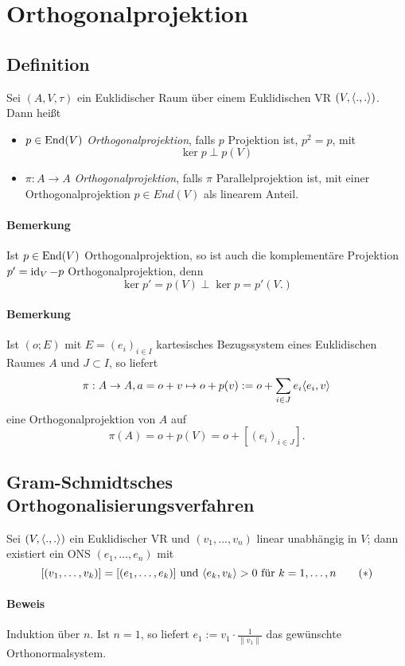 \section{Orthogonalprojektion}
\subsection{Definition}
\begin{Definition}[Orthogonalprojektion]
	Sei $ (A,V,\tau) $ ein Euklidischer Raum über einem Euklidischen VR $ (V, \langle .,. \rangle) $. Dann heißt
		\begin{itemize}
			\item $ p\in \operatorname{End}(V) $ \emph{Orthogonalprojektion}, falls $ p $ Projektion ist, $ p^2 = p $, mit
				\[ \ker p \perp p(V) \]
			\item $ \pi: A\to A $ \emph{Orthogonalprojektion}, falls $ \pi $ Parallelprojektion ist, mit einer Orthogonalprojektion $ p\in End(V) $ als linearem Anteil.
		\end{itemize}
\end{Definition}
\paragraph{Bemerkung}
	Ist $ p\in \operatorname{End}(V) $ Orthogonalprojektion, so ist auch die komplementäre Projektion $ p' = \operatorname{id}_V-p $ Orthogonalprojektion, denn
		\[ \ker p' = p(V)\perp \ker p = p'(V.) \]
\paragraph{Bemerkung}
	Ist $ (o;E) $ mit $ E=(e_i)_{i\in I} $ kartesisches Bezugssystem eines Euklidischen Raumes $ A $ und $ J\subset I $, so liefert
		\[ \pi: A\to A, a = o+v \mapsto o+p(v) := o+\sum_{i\in J}e_i\langle e_i,v \rangle \]
	eine Orthogonalprojektion von $ A $ auf
		\[ \pi(A) = o + p(V) = o + [(e_i)_{i\in J}]. \]

\subsection{Gram-Schmidtsches Orthogonalisierungsverfahren}
	Sei $ (V,\langle .,. \rangle) $ ein Euklidischer VR und $ (v_1,\dots,v_n) $ linear unabhängig in $ V $; dann existiert ein ONS $ (e_1,\dots,e_n) $ mit
		\[ [(v_1,\dots,v_k)] = [(e_1,\dots,e_k)] \text{ und } \langle e_k,v_k \rangle > 0 \text{ für } k = 1,\dots,n \tag{$ * $} \]
\paragraph{Beweis}
	Induktion über $ n $. Ist $ n=1 $, so liefert $ e_1 := v_1\cdot\frac{1}{\|v_1\|} $ das gewünschte Orthonormalsystem. 
	
